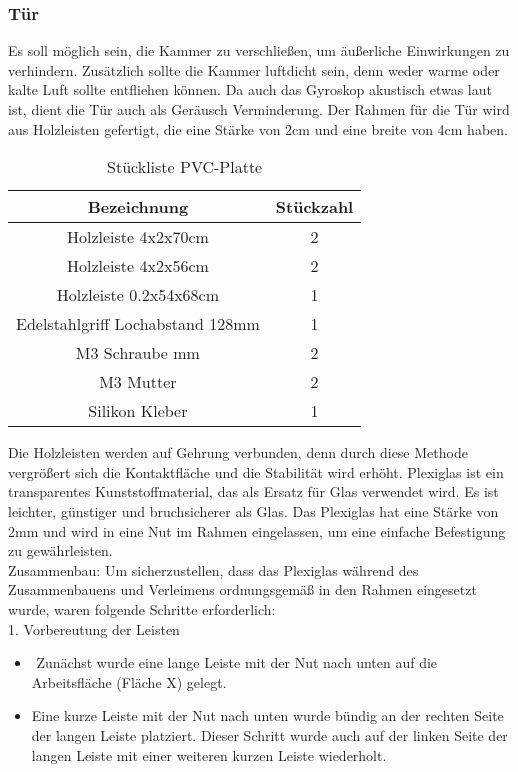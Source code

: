 \subsubsection{Tür}
Es soll möglich sein, die Kammer zu verschließen, um äußerliche Einwirkungen zu verhindern. Zusätzlich sollte die Kammer luftdicht sein, denn weder warme oder kalte Luft sollte entfliehen können. Da auch das Gyroskop akustisch etwas laut ist, dient die Tür auch als Geräusch Verminderung. 
Der Rahmen für die Tür wird aus Holzleisten gefertigt, die eine Stärke von 2cm und eine breite von 4cm haben.\\
\vspace{3mm}
\begin{table}[H]
    \centering
    \begin{tabular}{ | c | c | } 
  \hline
   \textbf{Bezeichnung} & \textbf{Stückzahl}\\ 
  \hline
   Holzleiste 4x2x70cm & 2\\ 
  \hline
   Holzleiste 4x2x56cm & 2 \\ 
  \hline
  Holzleiste 0.2x54x68cm & 1\\
  \hline
  Edelstahlgriff Lochabstand 128mm & 1\\
  \hline
  M3 Schraube mm & 2\\
  \hline
  M3 Mutter & 2\\
  \hline
  Silikon Kleber & 1\\
  \hline
\end{tabular}
    \caption{Stückliste PVC-Platte}
\end{table}
\newpage
Die Holzleisten werden auf Gehrung verbunden, denn durch diese Methode vergrößert sich die Kontaktfläche und die Stabilität wird erhöht. 
Plexiglas ist ein transparentes Kunststoffmaterial, das als Ersatz für Glas verwendet wird. Es ist leichter, günstiger und bruchsicherer als Glas. Das Plexiglas hat eine Stärke von 2mm und wird in eine Nut im Rahmen eingelassen, um eine einfache Befestigung zu gewährleisten.  \\
\vspace{3mm}
Zusammenbau:
Um sicherzustellen, dass das Plexiglas während des Zusammenbauens und Verleimens ordnungsgemäß in den Rahmen eingesetzt wurde, waren folgende Schritte erforderlich:\\
\vspace{3mm}
1. Vorbereutung der Leisten
\begin{itemize}
    \item  Zunächst wurde eine lange Leiste mit der Nut nach unten auf die Arbeitsfläche (Fläche X) gelegt.
    \item Eine kurze Leiste mit der Nut nach unten wurde bündig an der rechten Seite der langen Leiste platziert. Dieser Schritt wurde auch auf der linken Seite der langen Leiste mit einer weiteren kurzen Leiste wiederholt.
\end{itemize}
